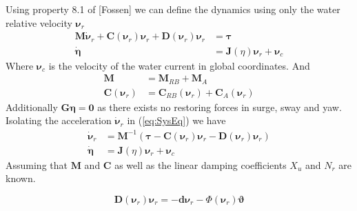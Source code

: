 \documentclass[12pt,a4]{article}
\begin{document}
Using property 8.1 of [Fossen] we can define the dynamics using only the water relative velocity $\bm{\nu}_r$
\begin{align}
	\label{eq:SysEq} \bm{M}\bm{\dot{\nu}}_r + \bm{C}(\bm{\nu}_r)\bm{\nu}_r +\bm{D}(\bm{\nu}_r)\bm{\nu}_r & = \bm{\tau}                           \\
	\bm{\dot{\eta}}                                                                                      & = \bm{J}(\eta)\bm{\nu}_r + \bm{\nu}_c
\end{align}
Where $\bm{\nu}_c$ is the velocity of the water current in global coordinates. And
\begin{align}
	\bm{M}             & = \bm{M}_{RB} + \bm{M}_{A}                         \\
	\bm{C}(\bm{\nu}_r) & = \bm{C}_{RB}(\bm{\nu}_r) + \bm{C}_{A}(\bm{\nu}_r)
\end{align}
Additionally $\bm{G}\bm{\eta} = \bm{0}$ as there exists no restoring forces in surge, sway and yaw.
Isolating the acceleration $\bm{\dot{\nu}}_r$ in (\ref{eq:SysEq}) we have
\begin{align}
	\bm{\dot{\nu}}_r & = \bm{M}^{-1} (\bm{\tau} -\bm{C}(\bm{\nu}_r)\bm{\nu}_r -\bm{D}(\bm{\nu}_r)\bm{\nu}_r ) \\
	\bm{\dot{\eta}}  & = \bm{J}(\eta)\bm{\nu}_r + \bm{\nu}_c
\end{align}
Assuming that $\bm{M}$ and $\bm{C}$ as well as the linear damping coefficients $X_u$ and $N_r$ are known.

\begin{equation}
	\bm{D}(\bm{\nu}_r)\bm{\nu}_r = - \bm{d} \bm{\nu}_r - \Phi(\bm{\nu}_r )\bm{\vartheta}
\end{equation}
\end{document}
